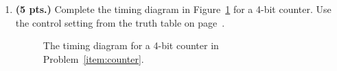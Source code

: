 \begin{enumerate}
\begin{solution} {
\begin{figure}[ht]
\end{figure}
} \end{solution}


\item{\bf (5 pts.)} Complete the timing diagram in Figure~\ref{fig:hwcount}
\label{item:counter}
for a 4-bit counter.  Use the control setting from the truth table on 
page~\pageref{page:counter}.
\begin{figure}[ht]
\caption{The timing diagram for a 4-bit counter in 
Problem~\ref{item:counter}.}
\label{fig:hwcount}
\end{figure}


\end{enumerate}
